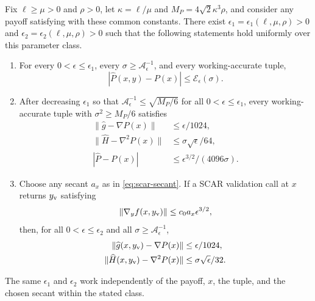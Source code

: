 \documentclass{article}
\begin{document}
\begin{lemma}
\label{lem:fixed-radius-oracle-accuracy}
Fix $\ell\ge\mu>0$ and $\rho>0$, let
$\kappa=\ell/\mu$ and $M_P=4\sqrt2\kappa^3\rho$, and consider any
payoff satisfying  with these common constants.  There
exist $\epsilon_1=\epsilon_1(\ell,\mu,\rho)>0$ and
$\epsilon_2=\epsilon_2(\ell,\mu,\rho)>0$ such that the following
statements hold uniformly over this parameter class.
\begin{enumerate}[label=(\roman*)]
 \item For every $0<\epsilon\le\epsilon_1$, every
 $\sigma\ge\mathcal A_\epsilon^{-1}$, and every working-accurate tuple,
 \begin{equation}\label{eq:working-proxy-bound}
  |\widehat P(x,y)-P(x)|
  \le\mathcal E_\epsilon(\sigma).
 \end{equation}
 \item After decreasing $\epsilon_1$ so that
 $\mathcal A_\epsilon^{-1}\le\sqrt{M_P/6}$ for all
 $0<\epsilon\le\epsilon_1$, every working-accurate tuple with
 $\sigma^2\ge M_P/6$ satisfies
 \begin{equation}\label{eq:working-safe-errors}
 \begin{aligned}
  \|\widehat g-\nabla P(x)\|&\le\epsilon/1024,\\
  \|\widehat H-\nabla^2P(x)\|&\le\sigma\sqrt\epsilon/64,\\
  |\widehat P-P(x)|&\le\epsilon^{3/2}/(4096\sigma).
 \end{aligned}
 \end{equation}
 \item Choose any secant $a_x$ as in \eqref{eq:scar-secant}.  If a
 SCAR validation call at $x$ returns $y_{\rm v}$ satisfying
 \begin{equation}\label{eq:validator-residual}
  \|\nabla_yf(x,y_{\rm v})\|
  \le c_0a_x\epsilon^{3/2},
 \end{equation}
 then, for all $0<\epsilon\le\epsilon_2$ and all
 $\sigma\ge\mathcal A_\epsilon^{-1}$,
 \begin{equation}\label{eq:validator-errors}
 \begin{aligned}
  \|\widehat g(x,y_{\rm v})-\nabla P(x)\|
   &\le\epsilon/1024,\\
  \|\widehat H(x,y_{\rm v})-\nabla^2P(x)\|
   &\le\sigma\sqrt\epsilon/32.
 \end{aligned}
 \end{equation}
\end{enumerate}
The same $\epsilon_1$ and $\epsilon_2$ work independently of the
payoff, $x$, the tuple, and the chosen secant within the stated class.
\end{lemma}
\end{document}
